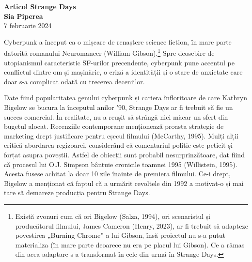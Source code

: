 \documentclass[a4paper, 12pt]{article}
\begin{document}
	
	
	\begin{center}
		{\fontsize{40}{48}\selectfont \bfseries Articol Strange Days} 
		\\\vspace{20pt}
		\vspace{10pt}
		\textbf{Sia Piperea}
		\vspace{8pt}
		\\ 7 februarie 2024
	\end{center}
	
	
Cyberpunk a început ca o mișcare de renaștere science fiction, în mare parte datorită romanului Neuromancer (William Gibson).\footnote{Există zvonuri cum că ori Bigelow (Salza, 1994), ori scenaristul și producătorul filmului, James Cameron (Henry, 2023), ar fi trebuit să adapteze povestirea „Burning Chrome” a lui Gibson, însă proiectul nu s-a putut materializa (în mare parte deoarece nu era pe placul lui Gibson). Ce a rămas din acea adaptare s-a transformat în cele din urmă în Strange Days.} Spre deosebire de utopianismul caracteristic SF-urilor precendente, cyberpunk pune accentul pe conflictul dintre om și mașinărie, o criză a identității și o stare de anxietate care doar s-a complicat odată cu trecerea deceniilor.\break

Date fiind popularitatea genului cyberpunk și cariera înfloritoare de care Kathryn Bigelow se bucura la începutul anilor '90, Strange Days ar fi trebuit să fie un succes comercial. În realitate, nu a reușit să strângă nici măcar un sfert din bugetul alocat. Recenziile contemporane menționează proasta strategie de marketing drept justificare pentru eșecul filmului (McCarthy, 1995). Mulți alții critică abordarea regizoarei, considerând că comentariul politic este peticit și forțat asupra poveștii. Astfel de obiecții sunt probabil nesurprinzătoare, dat fiind că procesul lui O.J. Simpson bântuie cronicile toamnei 1995 (Willistein, 1995). Acesta fusese achitat la doar 10 zile înainte de premiera filmului. Ce-i drept, Bigelow a menționat că faptul că a urmărit revoltele din 1992 a motivat-o și mai tare să demareze producția pentru Strange Days.\break
\end{document}

